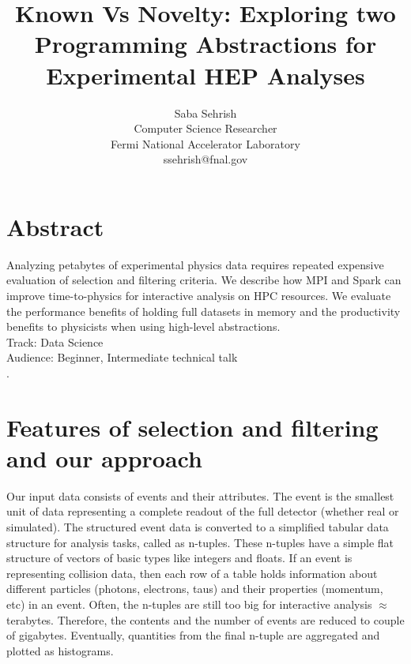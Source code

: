 \documentclass[10pt, twocolumn]{article}
\newcommand{\squeezeup}{\vspace{-5.5mm}}
\begin{document}
\title{Known Vs Novelty: Exploring two Programming Abstractions for Experimental HEP Analyses}
\author{Saba Sehrish \\ Computer Science Researcher\\ Fermi National Accelerator Laboratory \\ ssehrish@fnal.gov}
\date{}
\maketitle

\thispagestyle{empty}

\section*{Abstract}
\squeezeup
Analyzing petabytes of experimental physics data requires repeated expensive evaluation of selection and filtering criteria. We describe how MPI and Spark can improve time-to-physics for interactive analysis on HPC resources. We evaluate the performance benefits of holding full datasets in memory and the productivity benefits to physicists when using high-level abstractions. 
\\
Track: Data Science  \\
Audience: Beginner, Intermediate technical talk \\
\squeezeup
. 
\squeezeup
\section{Features of selection and filtering and our approach}


Our input data consists of events and their attributes. 
The event is the smallest unit of data representing a complete readout of the full
detector (whether real or simulated). 
The structured event data is converted to a simplified tabular data structure for analysis tasks, called as n-tuples. 
These n-tuples have a simple flat structure of vectors of basic types like integers and floats. 
If an event is representing collision data, then 
each row of a table holds information about different particles (photons, electrons, taus) and 
their properties (momentum, etc) in an event. Often, the n-tuples are still too big for interactive 
analysis $\approx$ terabytes. Therefore, the contents and the number of events are 
reduced to couple of gigabytes. Eventually, quantities from the final n-tuple are aggregated 
and plotted as histograms. 
\end{document}
